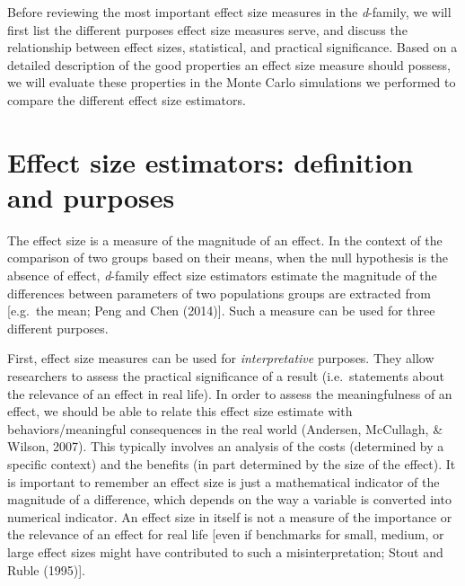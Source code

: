 \documentclass[
  english,
  man,floatsintext]{apa6}
\begin{document}
Before reviewing the most important effect size measures in the \emph{d}-family, we will first list the different purposes effect size measures serve, and discuss the relationship between effect sizes, statistical, and practical significance. Based on a detailed description of the good properties an effect size measure should possess, we will evaluate these properties in the Monte Carlo simulations we performed to compare the different effect size estimators.

\hypertarget{effect-size-estimators-definition-and-purposes}{%
\section{Effect size estimators: definition and purposes}\label{effect-size-estimators-definition-and-purposes}}

The effect size is a measure of the magnitude of an effect. In the context of the comparison of two groups based on their means, when the null hypothesis is the absence of effect, \emph{d}-family effect size estimators estimate the magnitude of the differences between parameters of two populations groups are extracted from {[}e.g.~the mean; Peng and Chen (2014){]}. Such a measure can be used for three different purposes.

First, effect size measures can be used for \emph{interpretative} purposes. They allow researchers to assess the practical significance of a result (i.e.~statements about the relevance of an effect in real life). In order to assess the meaningfulness of an effect, we should be able to relate this effect size estimate with behaviors/meaningful consequences in the real world (Andersen, McCullagh, \& Wilson, 2007). This typically involves an analysis of the costs (determined by a specific context) and the benefits (in part determined by the size of the effect). It is important to remember an effect size is just a mathematical indicator of the magnitude of a difference, which depends on the way a variable is converted into numerical indicator. An effect size in itself is not a measure of the importance or the relevance of an effect for real life {[}even if benchmarks for small, medium, or large effect sizes might have contributed to such a misinterpretation; Stout and Ruble (1995){]}.
\end{document}
